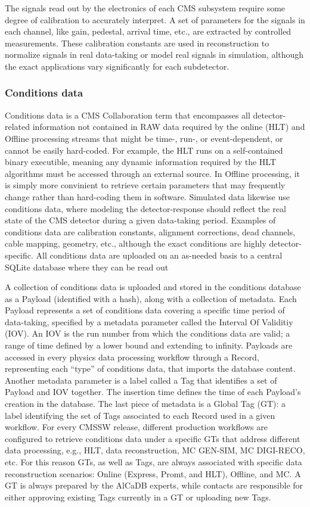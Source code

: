The signals read out by the electronics of each CMS subsystem require some degree of calibration to accurately interpret. A set of parameters for the signals in each channel, like gain, pedestal, arrival time, etc., are extracted by controlled measurements. These calibration constants are used in reconstruction to normalize signals in real data-taking or model real signals in simulation, although the exact applications vary significantly for each subdetector.

\subsubsection{Conditions data}

Conditions data is a CMS Collaboration term that encompasses all detector-related information not contained in RAW data required by the online (HLT) and Offline processing streams that might be time-, run-, or event-dependent, or cannot be easily hard-coded. For example, the HLT runs on a self-contained binary executible, meaning any dynamic information required by the HLT algorithms must be accessed through an external source. In Offline processing, it is simply more convinient to retrieve certain parameters that may frequently change rather than hard-coding them in software. Simulated data likewise use conditions data, where modeling the detector-response should reflect the real state of the CMS detector during a given data-taking period. Examples of conditions data are calibration constants, alignment corrections, dead channels, cable mapping, geometry, etc., although the exact conditions are highly detector-specific. All conditions data are uploaded on an as-needed basis to a central SQLite database where they can be read out 

A collection of conditions data is uploaded and stored in the conditions database as a Payload (identified with a hash), along with a collection of metadata. Each Payload represents a set of conditions data covering a specific time period of data-taking, specified by a metadata parameter called the Interval Of Validitiy (IOV). An IOV is the run number from which the conditions data are valid; a range of time defined by a lower bound and extending to infinity. Payloads are accessed in every physics data processing workflow through a Record, representing each ``type'' of conditions data, that imports the database content. Another metadata parameter is a label called a Tag that identifies a set of Payload and IOV together. The insertion time defines the time of each Payload's creation in the database. The last piece of metadata is a Global Tag (GT): a label identifying the set of Tags associated to each Record used in a given workflow. For every CMSSW release, different production workflows are configured to retrieve conditions data under a specific GTs that address different data processing, e.g., HLT, data reconstruction, MC GEN-SIM, MC DIGI-RECO, etc. For this reason GTs, as well as Tags, are always associated with specific data reconstruction scenarios: Online (Express, Promt, and HLT), Offline, and MC. A GT is always prepared by the AlCaDB experts, while contacts are responsible for either approving existing Tags currently in a GT or uploading new Tags.

